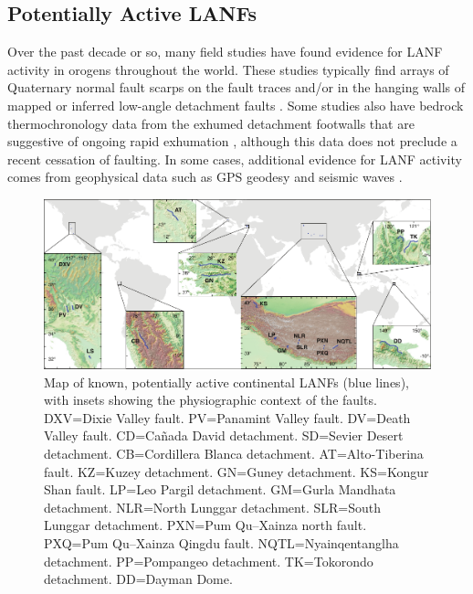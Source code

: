 \documentclass[twocolumn,grl]{AGUTeX}
\begin{document}
\begin{article}
\section{Potentially Active LANFs}

Over the past decade or so, many field studies have found evidence for LANF
activity in orogens throughout the world. These studies typically find arrays
of Quaternary normal fault scarps on the fault traces and/or in the hanging
walls of mapped or inferred low-angle detachment faults \citep [e.g.,]
[]{axen1999baja}. Some studies also have bedrock thermochronology data from the
exhumed detachment footwalls that are suggestive of ongoing rapid exhumation
\citep [e.g.,][]{sundell2013lunggar}, although this data does not preclude
a recent cessation of faulting. In some cases, additional evidence for LANF
activity comes from geophysical data such as GPS geodesy \citep [e.g.,]
[]{hreinsdottir2009altotib} and seismic waves \citep
[e.g.,][]{doser1987ancash}.

\begin{figure}%
\noindent\includegraphics[width=40pc]{./figures/active_lanfs_map_insets.pdf}
\caption{Map of known, potentially active continental LANFs (blue lines), with
insets showing the physiographic context of the faults.  DXV=Dixie Valley
fault.  PV=Panamint Valley fault.  DV=Death Valley fault.  CD=Ca\~nada David
detachment.  SD=Sevier Desert detachment.  CB=Cordillera Blanca detachment.  
AT=Alto-Tiberina fault.  KZ=Kuzey detachment.  GN=Guney detachment.  
KS=Kongur Shan fault.  LP=Leo Pargil detachment.  GM=Gurla Mandhata 
detachment. NLR=North Lunggar detachment.  SLR=South Lunggar detachment.  
PXN=Pum Qu--Xainza north fault.  PXQ=Pum Qu--Xainza Qingdu fault. 
NQTL=Nyainqentanglha detachment.  PP=Pompangeo detachment.  
TK=Tokorondo detachment.  DD=Dayman Dome.}
\label{fig:lanf_map}
\end{figure}


\end{article}
\end{document}
